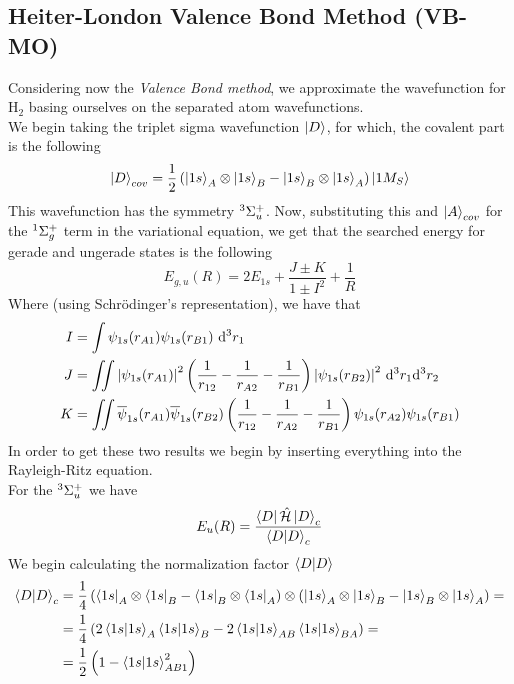 \documentclass[../qm.tex]{subfiles}
\begin{document}
	\subsection{Heiter-London Valence Bond Method (VB-MO)}
	Considering now the \textit{Valence Bond method}, we approximate the wavefunction for $\mathrm{H}_2$ basing ourselves on the separated atom wavefunctions.\\
	We begin taking the triplet sigma wavefunction $\ket{D}$, for which, the covalent part is the following
	\begin{equation}
		\ket{D}_{cov}=\frac{1}{2}\left( \ket{1s}_A\otimes\ket{1s}_B-\ket{1s}_B\otimes\ket{1s}_A \right)\ket{1 M_S}
		\label{eq:covalentDwavefunction}
	\end{equation}
	This wavefunction has the symmetry $\term[u]{\Sigma^+}{3}$. Now, substituting this and $\ket{A}_{cov}$ for the $\term[g]{\Sigma^+}{1}$ term in the variational equation, we get that the searched energy for gerade and ungerade states is the following
	\begin{equation}
		E_{g,u}(R)=2E_{1s}+\frac{J\pm K}{1\pm I^2}+\frac{1}{R}
		\label{eq:geradeungeradeheiterlondon}
	\end{equation}
	Where (using Schrödinger's representation), we have that
	\begin{equation*}
		\begin{aligned}
			I&=\int\psi_{1s}(r_{A1})\psi_{1s}(r_{B1})\diff[3]{r_1}\\
			J&=\iint\abs{\psi_{1s}(r_{A1})}^2\left( \frac{1}{r_{12}}-\frac{1}{r_{A2}}-\frac{1}{r_{B1}} \right)\abs{\psi_{1s}(r_{B2})}^2\ddiff[3]{r_1}{r_2}\\
			K&=\iint\cc{\psi}_{1s}(r_{A1})\cc{\psi}_{1s}(r_{B2})\left( \frac{1}{r_{12}}-\frac{1}{r_{A2}}-\frac{1}{r_{B1}} \right)\psi_{1s}(r_{A2})\psi_{1s}(r_{B1})
		\end{aligned}
	\end{equation*}
	In order to get these two results we begin by inserting everything into the Rayleigh-Ritz equation.\\
	For the $\term[u]{\Sigma^+}{3}$ we have
	\begin{equation*}
		E_u(R)=\frac{\bra{D}\opr{\ham}\ket{D}_c}{\bra{D}\ket{D}_c}
	\end{equation*}
	We begin calculating the normalization factor $\bra{D}\ket{D}$
	\begin{equation*}
		\begin{aligned}
			\bra{D}\ket{D}_c&=\frac{1}{4}\left( \bra{1s}_A\otimes\bra{1s}_B-\bra{1s}_B\otimes\bra{1s}_A \right)\otimes\left( \ket{1s}_A\otimes\ket{1s}_B-\ket{1s}_B\otimes\ket{1s}_A \right)=\\
			&=\frac{1}{4}\left( 2\bra{1s}\ket{1s}_{A}\bra{1s}\ket{1s}_B-2\bra{1s}\ket{1s}_{AB}\bra{1s}\ket{1s}_{BA} \right)=\\
			&=\frac{1}{2}\left( 1-\bra{1s}\ket{1s}_{AB1}^2 \right)
		\end{aligned}
	\end{equation*}
\end{document}
